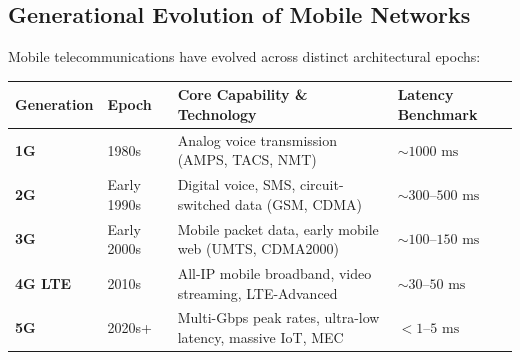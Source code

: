 \documentclass[11pt,a4paper,openany]{report}
\begin{document}
\subsection{Generational Evolution of Mobile Networks}
Mobile telecommunications have evolved across distinct architectural epochs:
\begin{center}
\begin{tabularx}{\textwidth}{>{\bfseries}l l X l}
\toprule
Generation & Epoch & Core Capability \& Technology & Latency Benchmark\\
\midrule
1G & 1980s & Analog voice transmission (AMPS, TACS, NMT) & $\sim 1000\text{ ms}$\\
2G & Early 1990s & Digital voice, SMS, circuit-switched data (GSM, CDMA) & $\sim 300\text{--}500\text{ ms}$\\
3G & Early 2000s & Mobile packet data, early mobile web (UMTS, CDMA2000) & $\sim 100\text{--}150\text{ ms}$\\
4G LTE & 2010s & All-IP mobile broadband, video streaming, LTE-Advanced & $\sim 30\text{--}50\text{ ms}$\\
5G & 2020s+ & Multi-Gbps peak rates, ultra-low latency, massive IoT, MEC & $< 1\text{--}5\text{ ms}$\\
\bottomrule
\end{tabularx}
\end{center}
\end{document}
